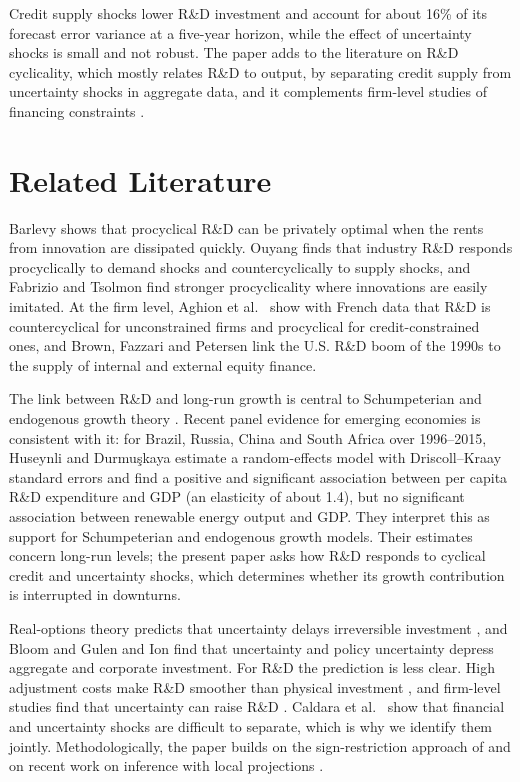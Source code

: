 \documentclass[conference]{IEEEtran}
\begin{document}
Credit supply shocks lower R\&D investment and account for about 16\% of its
forecast error variance at a five-year horizon, while the effect of
uncertainty shocks is small and not robust. The paper adds to the literature
on R\&D cyclicality, which mostly relates R\&D to output, by separating credit
supply from uncertainty shocks in aggregate data, and it complements
firm-level studies of financing constraints \cite{brown2009,aghion2012}.

\section{Related Literature}

Barlevy \cite{barlevy2007} shows that procyclical R\&D can be privately
optimal when the rents from innovation are dissipated quickly. Ouyang
\cite{ouyang2011} finds that industry R\&D responds procyclically to demand
shocks and countercyclically to supply shocks, and Fabrizio and Tsolmon
\cite{fabrizio2014} find stronger procyclicality where innovations are easily
imitated. At the firm level, Aghion et al.\ \cite{aghion2012} show with French
data that R\&D is countercyclical for unconstrained firms and procyclical for
credit-constrained ones, and Brown, Fazzari and Petersen \cite{brown2009} link
the U.S. R\&D boom of the 1990s to the supply of internal and external equity
finance.

The link between R\&D and long-run growth is central to Schumpeterian and
endogenous growth theory \cite{aghionhowitt1992}. Recent panel evidence for
emerging economies is consistent with it: for Brazil, Russia, China and South
Africa over 1996--2015, Huseynli and Durmu\c{s}kaya \cite{huseynli2026} estimate
a random-effects model with Driscoll--Kraay standard errors and find a positive
and significant association between per capita R\&D expenditure and GDP (an
elasticity of about 1.4), but no significant association between renewable
energy output and GDP. They interpret this as support for Schumpeterian and
endogenous growth models. Their estimates concern long-run levels; the present
paper asks how R\&D responds to cyclical credit and uncertainty shocks, which
determines whether its growth contribution is interrupted in downturns.

Real-options theory predicts that uncertainty delays irreversible investment
\cite{bernanke1983}, and Bloom \cite{bloom2009} and Gulen and Ion
\cite{gulen2016} find that uncertainty and policy uncertainty depress
aggregate and corporate investment. For R\&D the prediction is less clear.
High adjustment costs make R\&D smoother than physical investment
\cite{bloom2007rd}, and firm-level studies find that uncertainty can raise
R\&D \cite{stein2013,atanassov2015}. Caldara et al.\ \cite{caldara2016} show
that financial and uncertainty shocks are difficult to separate, which is why
we identify them jointly. Methodologically, the paper builds on the
sign-restriction approach of \cite{uhlig2005,rubio2010} and on recent work on
inference with local projections \cite{montiel2021}.
\end{document}
